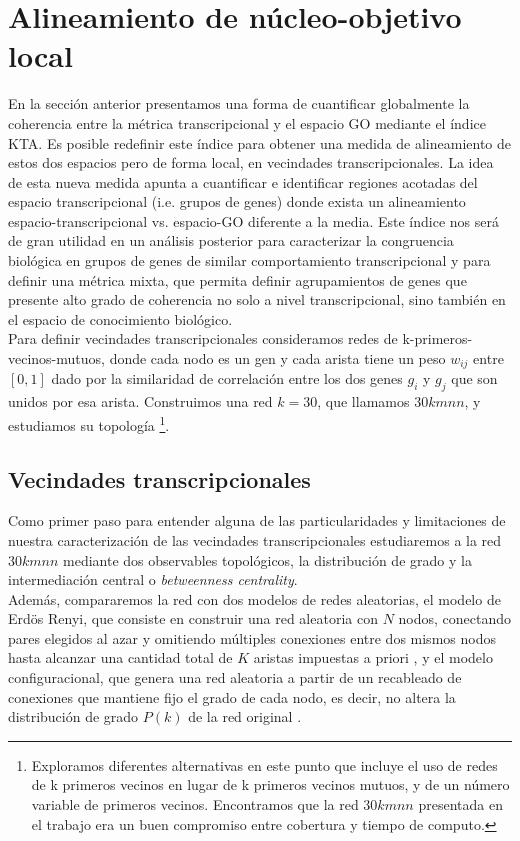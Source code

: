 \section{Alineamiento de núcleo-objetivo local}
En la sección anterior presentamos una forma de cuantificar globalmente la coherencia entre la métrica transcripcional y el espacio GO mediante el índice KTA. Es posible redefinir este índice para obtener una medida de alineamiento de estos dos espacios pero de forma local, en vecindades transcripcionales. La idea de esta nueva medida apunta a cuantificar e identificar regiones acotadas del espacio transcripcional (i.e. grupos de genes) donde exista un alineamiento espacio-transcripcional vs. espacio-GO diferente a la media. Este índice nos será de gran utilidad en un análisis posterior para caracterizar la congruencia biológica en grupos de genes de similar comportamiento transcripcional y para definir una métrica mixta, que permita definir agrupamientos de genes que presente alto grado de coherencia no solo a nivel transcripcional, sino también en el espacio de conocimiento biológico.\\
Para definir vecindades transcripcionales consideramos redes de k-primeros-vecinos-mutuos, donde cada nodo es un gen y cada arista tiene un peso $w_{ij}$ entre $[0, 1]$ dado por la similaridad de correlación entre los dos genes $g_i$ y $g_j$ que son unidos por esa arista. Construimos una red $k=30$, que llamamos $30kmnn$, y estudiamos su topología \footnote{Exploramos diferentes alternativas en este punto que incluye el uso de redes de k primeros vecinos en lugar de k primeros vecinos mutuos, y de un número variable de primeros vecinos. Encontramos que la red $30kmnn$ presentada en el trabajo era un buen compromiso entre cobertura y tiempo de computo.}.\\
\subsection{Vecindades transcripcionales}
Como primer paso para entender alguna de las particularidades y limitaciones de nuestra caracterización de las vecindades transcripcionales estudiaremos a la red $30kmnn$ mediante dos observables topológicos, la distribución de grado y la intermediación central o \textit{betweenness centrality}.\\
Además, compararemos la red con dos modelos de redes aleatorias, el modelo de Erdös Renyi, que consiste en construir una red aleatoria con $N$ nodos, conectando pares elegidos al azar y omitiendo múltiples conexiones entre dos mismos nodos hasta alcanzar una cantidad total de $K$ aristas impuestas a priori \cite{Erdos1959}, y el modelo configuracional, que genera una red aleatoria a partir de un recableado de conexiones que mantiene fijo el grado de cada nodo, es decir, no altera la distribución de grado $P(k)$ de la red original \cite{Molloy1995}.
